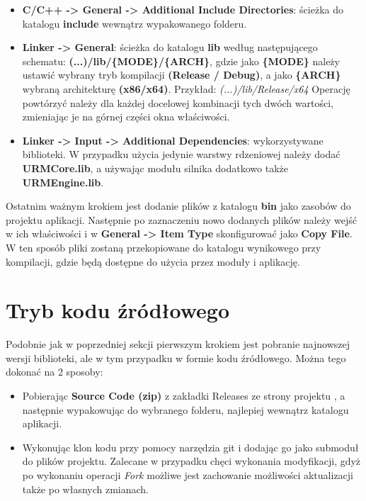 \begin{itemize}
	\item \textbf{C/C++ -> General -> Additional Include Directories}: ścieżka do katalogu \textbf{include} wewnątrz wypakowanego folderu. 
	\item \textbf{Linker -> General}: ścieżka do katalogu \textbf{lib} według następującego schematu: \textbf{(...)/lib/\{MODE\}/\{ARCH\}}, gdzie jako \textbf{\{MODE\}} należy ustawić wybrany tryb kompilacji \textbf{(Release / Debug)}, a jako \textbf{\{ARCH\}} wybraną architekturę \textbf{(x86/x64)}. Przykład: \textit{(...)/lib/Release/x64} Operację powtórzyć należy dla każdej docelowej kombinacji tych dwóch wartości, zmieniając je na górnej części okna właściwości. 
	\item \textbf{Linker -> Input -> Additional Dependencies}: wykorzystywane biblioteki. W przypadku użycia jedynie warstwy rdzeniowej należy dodać \textbf{URMCore.lib}, a używając modułu silnika dodatkowo także \textbf{URMEngine.lib}.
\end{itemize}

Ostatnim ważnym krokiem jest dodanie plików z katalogu \textbf{bin} jako zasobów do projektu aplikacji. Następnie po zaznaczeniu nowo dodanych plików należy wejść w ich właściwości i w \textbf{General -> Item Type} skonfigurować jako \textbf{Copy File}. W ten sposób pliki zostaną przekopiowane do katalogu wynikowego przy kompilacji, gdzie będą dostępne do użycia przez moduły i aplikację. 

\section*{Tryb kodu źródłowego}
Podobnie jak w poprzedniej sekcji pierwszym krokiem jest pobranie najnowszej wersji biblioteki, ale w tym przypadku w formie kodu źródłowego. Można tego dokonać na 2 sposoby:
\begin{itemize}
	\item Pobierając \textbf{Source Code (zip)} z zakładki Releases ze strony projektu \cite{GitHub:Minik:MasterThesisUniversalRenderingModuleD3D11}, a następnie wypakowując do wybranego folderu, najlepiej wewnątrz katalogu aplikacji.
	\item Wykonując klon kodu przy pomocy narzędzia git i dodając go jako submoduł do plików projektu. Zalecane w przypadku chęci wykonania modyfikacji, gdyż po wykonaniu operacji \textit{Fork} możliwe jest zachowanie możliwości aktualizacji także po własnych zmianach.
\end{itemize}

